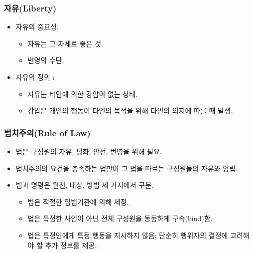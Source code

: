 \documentclass[aspectratio=169,xcolor=dvipsnames,handout]{beamer}
\begin{document}
\begin{frame}[<+->]
\frametitle{자유(Liberty)}
    \begin{itemize}
        \item 자유의 중요성. 
        \begin{itemize}
            \item 자유는 그 자체로 좋은 것.
            \item 번영의 수단.
        \end{itemize}
        \item 자유의 정의 : 
        \begin{itemize}
            \item  자유는 타인에 의한 강압이 없는 상태.
            \item  강압은 개인의 행동이 타인의 목적을 위해 타인의 의지에 따를 때 발생.
        \end{itemize}
    \end{itemize}
\end{frame}

\begin{frame}[<+->]
\frametitle{법치주의(Rule of Law)}
    \begin{itemize}
        \item 법은 구성원의 자유, 평화, 안전, 번영을 위해 필요.
        \item 법치주의의 요건을 충족하는 법만이 그 법을 따르는 구성원들의 자유와 양립.
        \item 법과 명령은 원천, 대상, 방법 세 가지에서 구분.
        \begin{itemize}
            \item 법은 적절한 입법기관에 의해 제정.
            \item 법은 특정한 사인이 아닌 전체 구성원을 동등하게 구속(bind)함.
            \item 법은 특정인에게 특정 행동을 지시하지 않음; 단순히 행위자의 결정에 고려해야 할 추가 정보를 제공.
        \end{itemize}
    \end{itemize}
\end{frame}
\end{document}
